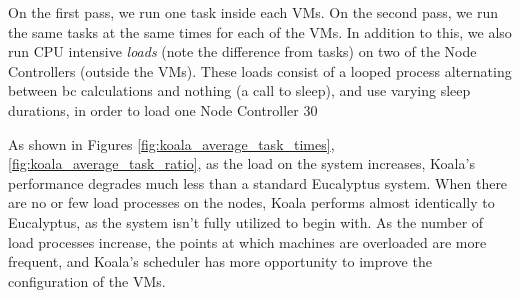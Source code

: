 On the first pass, we run one task inside each VMs.  On the second pass, we run the same tasks at the same times for each of the VMs.  In addition to this, we also run CPU intensive \emph{loads} (note the difference from tasks) on two of the Node Controllers (outside the VMs).  These loads consist of a looped process alternating between bc calculations and nothing (a call to sleep), and use varying sleep durations, in order to load one Node Controller 30%

As shown in Figures \ref{fig:koala_average_task_times},\ref{fig:koala_average_task_ratio}, as the load on the system increases, Koala's performance degrades much less than a standard Eucalyptus system.  When there are no or few load processes on the nodes, Koala performs almost identically to Eucalyptus, as the system isn't fully utilized to begin with.  As the number of load processes increase, the points at which machines are overloaded are more frequent, and Koala's scheduler has more opportunity to improve the configuration of the VMs.

